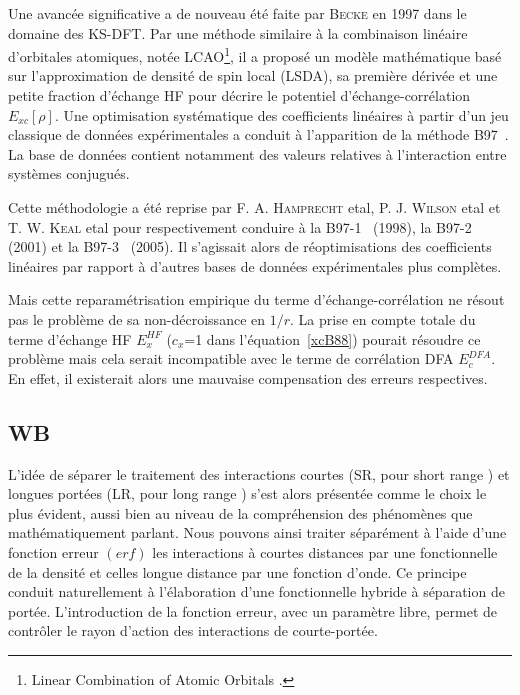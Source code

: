 {{Une avancée significative a de nouveau été faite par \textsc{Becke} en 1997 dans le domaine des KS-DFT. Par une méthode similaire à la combinaison linéaire d'orbitales atomiques, notée LCAO\footnote{\og Linear Combination of Atomic Orbitals \fg{}.}, il a proposé un modèle mathématique basé sur l'approximation de densité de spin local (LSDA), sa première dérivée et une petite fraction d'échange HF pour décrire le potentiel d'échange-corrélation $E_{xc}[\rho]$. Une optimisation systématique des coefficients linéaires à partir d'un jeu classique de données expérimentales a conduit à l'apparition de la méthode B97~\cite{B97}. La base de données contient notamment des valeurs relatives à l'interaction entre systèmes conjugués.

Cette méthodologie a été reprise par F. A. \textsc{Hamprecht} etal, P. J. \textsc{Wilson} etal et T. W. \textsc{Keal} etal pour respectivement conduire à la B97-1~\cite{B97a} (1998), la B97-2~\cite{B97b} (2001) et la B97-3~\cite{B97c} (2005). Il s'agissait alors de réoptimisations des coefficients linéaires par rapport à d'autres bases de données expérimentales plus complètes.

Mais cette reparamétrisation empirique du terme d'échange-corrélation ne résout pas le problème de sa non-décroissance en $1/r$. La prise en compte totale du terme d'échange HF $E_{x}^{HF}$ ($c_{x}$=1 dans l'équation~\ref{xcB88}) pourait résoudre ce problème mais cela serait incompatible avec le terme de corrélation DFA $E_{c}^{DFA}$. En effet, il existerait alors une mauvaise compensation des erreurs respectives.

\subsection{WB}

L'idée de séparer le traitement des interactions courtes (SR, pour \og short range \fg{}) et longues portées (LR, pour \og long range \fg{}) s'est alors présentée comme le choix le plus évident, aussi bien au niveau de la compréhension des phénomènes que mathématiquement parlant. Nous pouvons ainsi traiter séparément à l'aide d'une fonction erreur $(erf)$ les interactions à courtes distances par une fonctionnelle de la densité et celles longue distance par une fonction d'onde. Ce principe conduit naturellement à l'élaboration d'une fonctionnelle hybride à séparation de portée. L'introduction de la fonction erreur, avec un paramètre libre, permet de contrôler le rayon d'action des interactions de courte-portée.

}}

